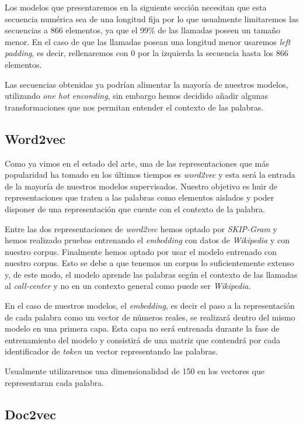 Los modelos que presentaremos en la siguiente sección necesitan que esta secuencia numérica sea de una longitud fija por lo que usualmente limitaremos las secuencias a 866 elementos, ya que el 99\% de las llamadas poseen un tamaño menor. En el caso de  que las llamadas posean una longitud menor usaremos \textit{left padding}, es decir, rellenaremos con 0 por la izquierda la secuencia hasta los 866 elementos.


Las secuencias obtenidas ya podrían alimentar la mayoría de nuestros modelos, utilizando \textit{one hot enconding}, sin embargo hemos decidido añadir algunas transformaciones que nos permitan entender el contexto de las palabras.  

\subsection{Word2vec}
Como ya vimos en el estado del arte, una de las representaciones que más popularidad ha tomado  en los últimos tiempos es \textit{word2vec} y esta será la entrada de la mayoría de nuestros modelos supervisados. Nuestro objetivo es huir de representaciones que traten a las palabras como elementos aislados y poder disponer de una representación que cuente con el contexto de la palabra.

Entre las dos representaciones de \textit{word2vec} hemos optado por \textit{SKIP-Gram} y hemos realizado pruebas entrenando el \textit{embedding} con datos de \textit{Wikipedia} y con nuestro corpus. Finalmente hemos optado por usar el modelo entrenado con nuestro corpus. Esto se debe a que tenemos un corpus lo suficientemente extenso y, de este modo, el modelo aprende las palabras según el contexto de las llamadas al \textit{call-center} y no en un contexto general como puede ser \textit{Wikipedia}.

En el caso de nuestros modelos, el \textit{embedding}, es decir el paso a la representación de cada palabra como un vector de números reales, se realizará dentro del mismo modelo en una primera capa. Esta capa no será entrenada durante la fase de entrenamiento del modelo y consistirá de una matriz que contendrá por cada identificador de \textit{token} un vector representando las palabras. 


Usualmente utilizaremos una dimensionalidad de 150 en los vectores que representaran cada palabra.

\subsection{Doc2vec}

